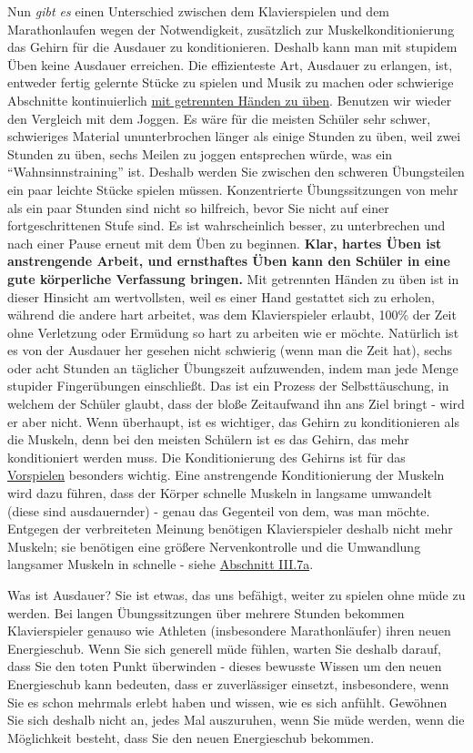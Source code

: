 Nun \textit{gibt es} einen Unterschied zwischen dem Klavierspielen und dem Marathonlaufen wegen der Notwendigkeit, zusätzlich zur Muskelkonditionierung das Gehirn für die Ausdauer zu konditionieren.
Deshalb kann man mit stupidem Üben keine Ausdauer erreichen.
Die effizienteste Art, Ausdauer zu erlangen, ist, entweder fertig gelernte Stücke zu spielen und Musik zu machen oder schwierige Abschnitte kontinuierlich \hyperref[c1ii7]{mit getrennten Händen zu üben}.
Benutzen wir wieder den Vergleich mit dem Joggen.
Es wäre für die meisten Schüler sehr schwer, schwieriges Material ununterbrochen länger als einige Stunden zu üben, weil zwei Stunden zu üben, sechs Meilen zu joggen entsprechen würde, was ein \enquote{Wahnsinnstraining} ist.
Deshalb werden Sie zwischen den schweren Übungsteilen ein paar leichte Stücke spielen müssen.
Konzentrierte Übungssitzungen von mehr als ein paar Stunden sind nicht so hilfreich, bevor Sie nicht auf einer fortgeschrittenen Stufe sind.
Es ist wahrscheinlich besser, zu unterbrechen und nach einer Pause erneut mit dem Üben zu beginnen.
\textbf{Klar, hartes Üben ist anstrengende Arbeit, und ernsthaftes Üben kann den Schüler in eine gute körperliche Verfassung bringen.}
Mit getrennten Händen zu üben ist in dieser Hinsicht am wertvollsten, weil es einer Hand gestattet sich zu erholen, während die andere hart arbeitet, was dem Klavierspieler erlaubt, 100\% der Zeit ohne Verletzung oder Ermüdung so hart zu arbeiten wie er möchte.
Natürlich ist es von der Ausdauer her gesehen nicht schwierig (wenn man die Zeit hat), sechs oder acht Stunden an täglicher Übungszeit aufzuwenden, indem man jede Menge stupider Fingerübungen einschließt.
Das ist ein Prozess der Selbsttäuschung, in welchem der Schüler glaubt, dass der bloße Zeitaufwand ihn ans Ziel bringt - wird er aber nicht.
Wenn überhaupt, ist es wichtiger, das Gehirn zu konditionieren als die Muskeln, denn bei den meisten Schülern ist es das Gehirn, das mehr konditioniert werden muss.
Die Konditionierung des Gehirns ist für das \hyperref[c1iii14]{Vorspielen} besonders wichtig.
Eine anstrengende Konditionierung der Muskeln wird dazu führen, dass der Körper schnelle Muskeln in langsame umwandelt (diese sind ausdauernder) - genau das Gegenteil von dem, was man möchte.
Entgegen der verbreiteten Meinung benötigen Klavierspieler deshalb nicht mehr Muskeln; sie benötigen eine größere Nervenkontrolle und die Umwandlung langsamer Muskeln in schnelle - siehe \hyperref[c1iii7aMuskeln]{Abschnitt III.7a}.

Was ist Ausdauer? Sie ist etwas, das uns befähigt, weiter zu spielen ohne müde zu werden.
Bei langen Übungssitzungen über mehrere Stunden bekommen Klavierspieler genauso wie Athleten (insbesondere Marathonläufer) ihren neuen Energieschub.
Wenn Sie sich generell müde fühlen, warten Sie deshalb darauf, dass Sie den toten Punkt überwinden - dieses bewusste Wissen um den neuen Energieschub kann bedeuten, dass er zuverlässiger einsetzt, insbesondere, wenn Sie es schon mehrmals erlebt haben und wissen, wie es sich anfühlt.
Gewöhnen Sie sich deshalb nicht an, jedes Mal auszuruhen, wenn Sie müde werden, wenn die Möglichkeit besteht, dass Sie den neuen Energieschub bekommen.


